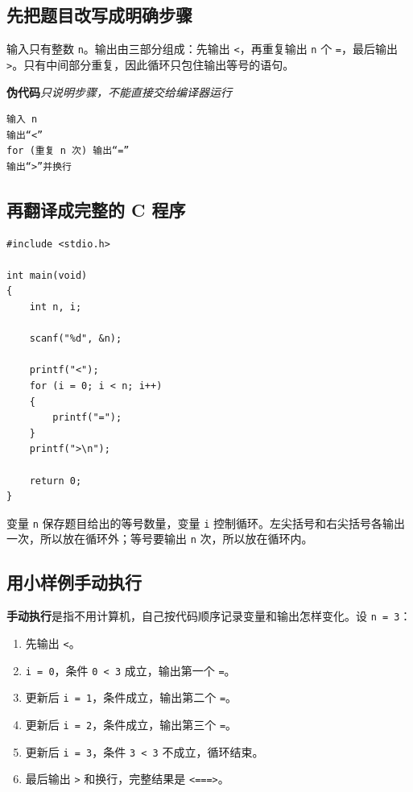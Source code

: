 \documentclass[UTF8,zihao=-4,fontset=windows]{ctexart}
\newcommand{\term}[1]{\textbf{\color{navy}#1}}
\newcommand{\pseudolabel}{\noindent\textbf{伪代码}\quad\textit{只说明步骤，不能直接交给编译器运行}\par\nopagebreak}
\begin{document}
\subsection{先把题目改写成明确步骤}

输入只有整数 \verb|n|。输出由三部分组成：先输出 \verb|<|，再重复输出 \verb|n| 个 \verb|=|，最后输出 \verb|>|。只有中间部分重复，因此循环只包住输出等号的语句。

\pseudolabel
\begin{lstlisting}[style=pseudostyle]
输入 n
输出“<”
for (重复 n 次) 输出“=”
输出“>”并换行
\end{lstlisting}

\subsection{再翻译成完整的 C 程序}

\begin{lstlisting}[style=cstyle]
#include <stdio.h>

int main(void)
{
    int n, i;

    scanf("%d", &n);

    printf("<");
    for (i = 0; i < n; i++)
    {
        printf("=");
    }
    printf(">\n");

    return 0;
}
\end{lstlisting}

变量 \verb|n| 保存题目给出的等号数量，变量 \verb|i| 控制循环。左尖括号和右尖括号各输出一次，所以放在循环外；等号要输出 \verb|n| 次，所以放在循环内。

\subsection{用小样例手动执行}

\term{手动执行}是指不用计算机，自己按代码顺序记录变量和输出怎样变化。设 \verb|n = 3|：
\begin{enumerate}
  \item 先输出 \verb|<|。
  \item \verb|i = 0|，条件 \verb|0 < 3| 成立，输出第一个 \verb|=|。
  \item 更新后 \verb|i = 1|，条件成立，输出第二个 \verb|=|。
  \item 更新后 \verb|i = 2|，条件成立，输出第三个 \verb|=|。
  \item 更新后 \verb|i = 3|，条件 \verb|3 < 3| 不成立，循环结束。
  \item 最后输出 \verb|>| 和换行，完整结果是 \verb|<===>|。
\end{enumerate}
\end{document}
